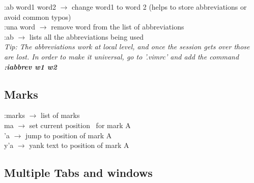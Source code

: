\documentclass[twoside,a4paper]{article}
\newcommand{\tcb}{\color{blue}} \newcommand{\tcc}{\color{cyan}} \newcommand{\tcr}{\color{red}}
\newcommand{\tcg}{\color{gray}} \newcommand{\tco}{\color{orange}} \newcommand{\tcp}{\color{purple}}
\newcommand{\tck}{\color{black}}
\newcommand{\ra }{$\rightarrow$ }
\newcommand{\hs}{\hspace}
\begin{document}
\begin{multicols}{2}
    \tcr :ab \tcb  word1 word2 \tck \ra change word1 to word 2 (helps to store abbreviations or
    avoid common typos)\\
    \tcr :una \tcb  word \tck $\rightarrow$ remove word from the list of abbreviations\\
    \tcr :ab \tck \ra lists all the abbreviations being used\\

    \hs{-0.5 cm}\tcg \textit{Tip: The abbreviations work at local level, and once the session gets
        over those are lost.  In order to make it universal, go to '.vimrc' and add the command
        \textbf{:iabbrev w1 w2} }

    \tcc \subsection{Marks}

    \tcr :marks \tck \ra list of marks\\
    \tcr ma \tck \ra set current position \ for mark A\\
    \tcr 'a \tck \ra jump to position of mark A\\
    \tcr y'a \tck \ra yank text to position of mark A

    \vspace{1 cm}
    \tcc \subsection{Multiple Tabs and windows}


\end{multicols}
\end{document}
